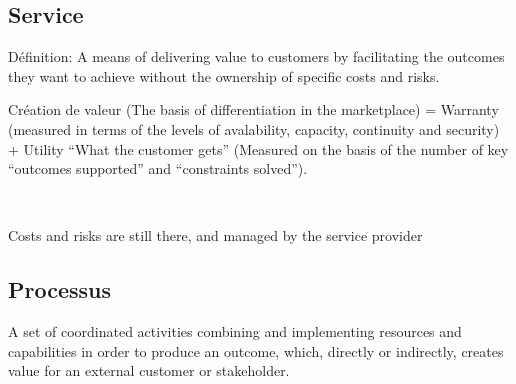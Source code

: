 \documentclass[a4paper,11pt]{article}
\begin{document}
\subsection{Service}

Définition: A means of delivering value to customers by facilitating the
outcomes they want to achieve without the ownership of specific costs and risks.

Création de valeur (The basis of differentiation in the marketplace) =
Warranty (measured in terms of the levels of avalability, capacity, continuity
and security) + Utility ``What the customer gets'' (Measured on the basis of the
number of key ``outcomes supported'' and ``constraints solved'').

\

Costs and risks are still there, and managed by the service provider

\subsection{Processus}

A set of coordinated activities combining and implementing resources and
capabilities in order to produce an outcome, which, directly or indirectly,
creates value for an external customer or stakeholder.
\end{document}
